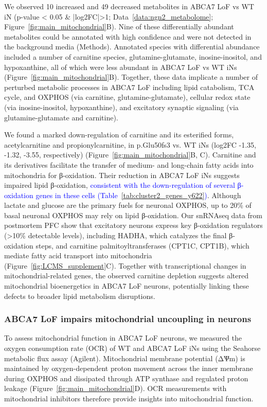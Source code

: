 We observed 10 increased and 49 decreased metabolites in ABCA7 LoF vs WT iN (p-value < 0.05 & |log2FC|>1; Data~\ref{data:ngn2_metabolome}; Figure~\ref{fig:main_mitochondrial}B). Nine of these differentially abundant metabolites could be annotated with high confidence and were not detected in the background media (Methods). Annotated species with differential abundance included a number of carnitine species, glutamine-glutamate, inosine-inositol, and hypoxanthine, all of which were less abundant in ABCA7 LoF vs WT iNs (Figure~\ref{fig:main_mitochondrial}B). Together, these data implicate a number of perturbed metabolic processes in ABCA7 LoF including lipid catabolism, TCA cycle, and OXPHOS (via carnitine\cite{Virmani2022-uc}, glutamine-glutamate\cite{Yoo2020-lh,noauthor_2023-sp}), cellular redox state (via inosine-inositol\cite{Chatree2020-qn,Basile2022-dd}, hypoxanthine\cite{Furuhashi2020-oi,Lee2018-tk}), and excitatory synaptic signaling (via glutamine-glutamate\cite{Morland2022-dk,noauthor_2021-cn,noauthor_2022-jz} and carnitine\cite{Inazu2008-wg,noauthor_2016-gp,Janiri1991-sx}). 

We found a marked down-regulation of carnitine and its esterified forms, acetylcarnitine and propionylcarnitine, in p.Glu50fs3 vs. WT iNs (log2FC -1.35, -1.32, -3.55, respectively) (Figure~\ref{fig:main_mitochondrial}B, C). Carnitine and its derivatives facilitate the transfer of medium- and long-chain fatty acids into mitochondria for β-oxidation\cite{noauthor_2016-la,noauthor_2004-tm}. Their reduction in ABCA7 LoF iNs suggests impaired lipid β-oxidation, \textcolor{blue}{consistent with the down-regulation of several β-oxidation genes in these cells (Table~\ref{tab:cluster2_genes_y622})}. Although lactate and glucose are the primary fuels for neuronal OXPHOS\cite{Dienel2018-dt,Trigo2022-ym,Yellen2018-kr}, up to 20\% of basal neuronal OXPHOS may rely on lipid β-oxidation\cite{Morant-Ferrando2023-va}. Our snRNAseq data from postmortem PFC show that excitatory neurons express key β-oxidation regulators (>10\% detectable levels), including HADHA, which catalyzes the final β-oxidation steps, and carnitine palmitoyltransferases (CPT1C, CPT1B), which mediate fatty acid transport into mitochondria (Figure~\ref{fig:LCMS_supplement}C). Together with transcriptional changes in mitochondrial-related genes, the observed carnitine depletion suggests altered mitochondrial bioenergetics in ABCA7 LoF neurons, potentially linking these defects to broader lipid metabolism disruptions.

\subsubsection{ABCA7 LoF impairs mitochondrial uncoupling in neurons}
To assess mitochondrial function in ABCA7 LoF neurons, we measured the oxygen consumption rate (OCR) of WT and ABCA7 LoF iNs using the Seahorse metabolic flux assay (Agilent). Mitochondrial membrane potential (ΔѰm) is maintained by oxygen-dependent proton movement across the inner membrane during OXPHOS and dissipated through ATP synthase and regulated proton leakage (Figure~\ref{fig:main_mitochondrial}D). OCR measurements with mitochondrial inhibitors therefore provide insights into mitochondrial function\cite{Divakaruni2014-eq}.

